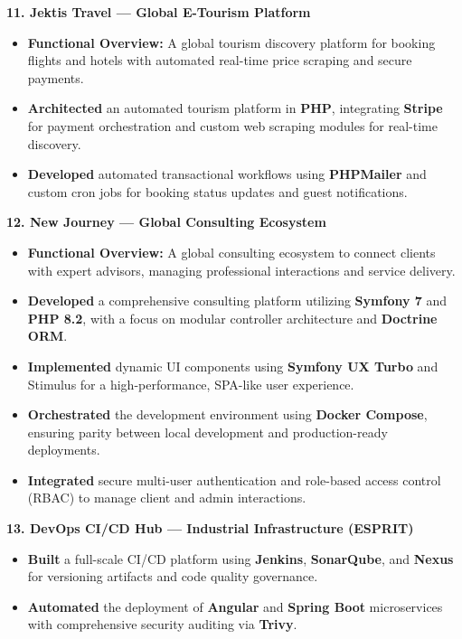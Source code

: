 \documentclass[10pt, letterpaper]{article}
\newenvironment{highlights}{
\begin{itemize}[leftmargin=12pt, itemsep=2pt]
}{
\end{itemize}
}
\begin{document}
\textbf{11. Jektis Travel --- Global E-Tourism Platform}
\begin{highlights}
\item \textbf{Functional Overview:} A global tourism discovery platform for booking flights and hotels with automated real-time price scraping and secure payments.
\item \textbf{Architected} an automated tourism platform in \textbf{PHP}, integrating \textbf{Stripe} for payment orchestration and custom web scraping modules for real-time discovery.
\item \textbf{Developed} automated transactional workflows using \textbf{PHPMailer} and custom cron jobs for booking status updates and guest notifications.
\end{highlights}

\textbf{12. New Journey --- Global Consulting Ecosystem}
\begin{highlights}
\item \textbf{Functional Overview:} A global consulting ecosystem to connect clients with expert advisors, managing professional interactions and service delivery.
\item \textbf{Developed} a comprehensive consulting platform utilizing \textbf{Symfony 7} and \textbf{PHP 8.2}, with a focus on modular controller architecture and \textbf{Doctrine ORM}.
\item \textbf{Implemented} dynamic UI components using \textbf{Symfony UX Turbo} and Stimulus for a high-performance, SPA-like user experience.
\item \textbf{Orchestrated} the development environment using \textbf{Docker Compose}, ensuring parity between local development and production-ready deployments.
\item \textbf{Integrated} secure multi-user authentication and role-based access control (RBAC) to manage client and admin interactions.
\end{highlights}

\textbf{13. DevOps CI/CD Hub --- Industrial Infrastructure (ESPRIT)}
\begin{highlights}
\item \textbf{Built} a full-scale CI/CD platform using \textbf{Jenkins}, \textbf{SonarQube}, and \textbf{Nexus} for versioning artifacts and code quality governance.
\item \textbf{Automated} the deployment of \textbf{Angular} and \textbf{Spring Boot} microservices with comprehensive security auditing via \textbf{Trivy}.
\end{highlights}
\end{document}
